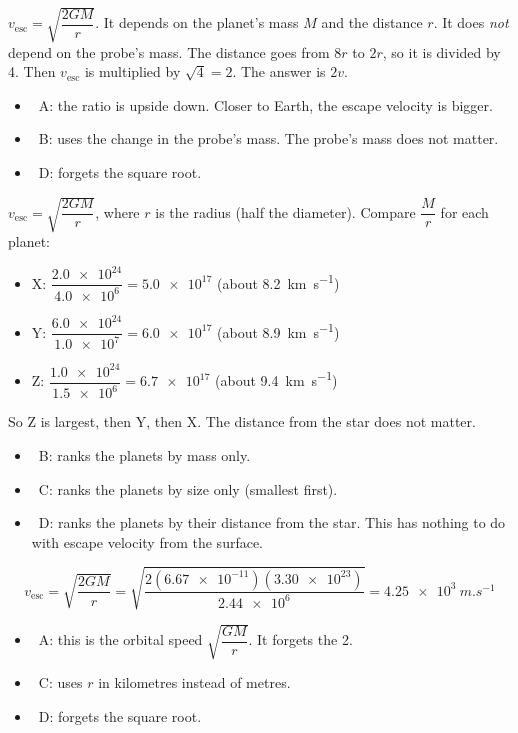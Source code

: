 \begin{practiceanswers}
\begin{practiceans}
  $v_\mathrm{esc} = \sqrt{\dfrac{2GM}{r}}$. It depends on the planet's mass $M$ and the distance
  $r$. It does \emph{not} depend on the probe's mass. The distance goes from $8r$ to $2r$, so it
  is divided by 4. Then $v_\mathrm{esc}$ is multiplied by $\sqrt{4} = 2$. The answer is $2v$.
  \begin{itemize}
    \item \xmark\ A: the ratio is upside down. Closer to Earth, the escape velocity is bigger.
    \item \xmark\ B: uses the change in the probe's mass. The probe's mass does not matter.
    \item \xmark\ D: forgets the square root.
  \end{itemize}
\end{practiceans}

\begin{practiceans}
  $v_\mathrm{esc} = \sqrt{\dfrac{2GM}{r}}$, where $r$ is the radius (half the diameter). Compare
  $\dfrac{M}{r}$ for each planet:
  \begin{itemize}
    \item X: $\dfrac{\num{2.0e24}}{\num{4.0e6}} = \num{5.0e17}$
          \quad(about \qty{8.2}{km.s^{-1}})
    \item Y: $\dfrac{\num{6.0e24}}{\num{1.0e7}} = \num{6.0e17}$
          \quad(about \qty{8.9}{km.s^{-1}})
    \item Z: $\dfrac{\num{1.0e24}}{\num{1.5e6}} = \num{6.7e17}$
          \quad(about \qty{9.4}{km.s^{-1}})
  \end{itemize}
  So Z is largest, then Y, then X. The distance from the star does not matter.
  \begin{itemize}
    \item \xmark\ B: ranks the planets by mass only.
    \item \xmark\ C: ranks the planets by size only (smallest first).
    \item \xmark\ D: ranks the planets by their distance from the star. This has nothing to do with
          escape velocity from the surface.
  \end{itemize}
\end{practiceans}

\begin{practiceans}
  \[ v_\mathrm{esc} = \sqrt{\frac{2GM}{r}}
       = \sqrt{\frac{2(\num{6.67e-11})(\num{3.30e23})}{\num{2.44e6}}}
       = \qty{4.25e3}{m.s^{-1}} \]
  \begin{itemize}
    \item \xmark\ A: this is the orbital speed $\sqrt{\dfrac{GM}{r}}$. It forgets the 2.
    \item \xmark\ C: uses $r$ in kilometres instead of metres.
    \item \xmark\ D: forgets the square root.
  \end{itemize}
\end{practiceans}


\end{practiceanswers}
